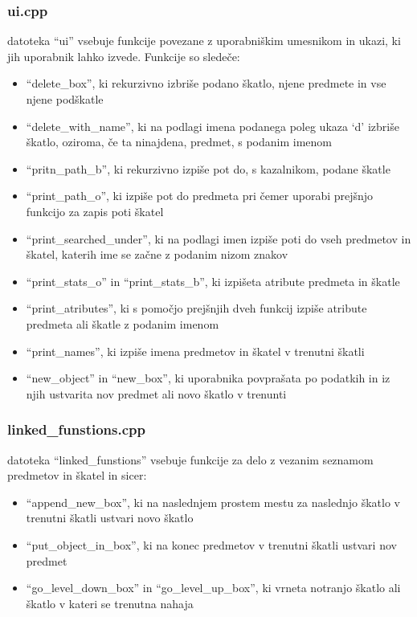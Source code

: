 \documentclass[12pt, a4paper, notitlepage]{article}
\begin{document}
      \subsubsection{ui.cpp}
      datoteka ``ui'' vsebuje funkcije povezane z uporabniškim umesnikom in ukazi, ki jih uporabnik lahko izvede. Funkcije so sledeče:
      \begin{itemize}
        \item ``delete\_box'', ki rekurzivno izbriše podano škatlo, njene predmete in vse njene podškatle
        \item ``delete\_with\_name'', ki na podlagi imena podanega poleg ukaza `d' izbriše škatlo, oziroma, če ta ninajdena, predmet, s podanim imenom
        \item ``pritn\_path\_b'', ki rekurzivno izpiše pot do, s kazalnikom, podane škatle
        \item ``print\_path\_o'', ki izpiše pot do predmeta pri čemer uporabi prejšnjo funkcijo za zapis poti škatel
        \item ``print\_searched\_under'', ki na podlagi imen izpiše poti do vseh predmetov in škatel, katerih ime se začne z podanim nizom znakov
        \item ``print\_stats\_o'' in ``print\_stats\_b'', ki izpišeta atribute predmeta in škatle
        \item ``print\_atributes'', ki s pomočjo prejšnjih dveh funkcij izpiše atribute predmeta ali škatle z podanim imenom
        \item ``print\_names'', ki izpiše imena predmetov in škatel v trenutni škatli
        \item ``new\_object'' in ``new\_box'', ki uporabnika povprašata po podatkih in iz njih ustvarita nov predmet ali novo škatlo v trenunti
      \end{itemize}
      \subsubsection{linked\_funstions.cpp}
      datoteka ``linked\_funstions'' vsebuje funkcije za delo z vezanim seznamom predmetov in škatel in sicer:
      \begin{itemize}
        \item ``append\_new\_box'', ki na naslednjem prostem mestu za naslednjo škatlo v trenutni škatli ustvari novo škatlo
        \item ``put\_object\_in\_box'', ki na konec predmetov v trenutni škatli ustvari nov predmet
        \item ``go\_level\_down\_box'' in ``go\_level\_up\_box'', ki vrneta notranjo škatlo ali škatlo v kateri se trenutna nahaja
      \end{itemize}
\end{document}
